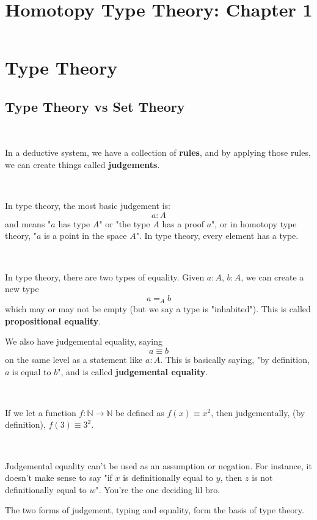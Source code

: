 \documentclass{article}
\title{Homotopy Type Theory: Chapter 1}
\begin{document}
\maketitle

\section{Type Theory}

\subsection{Type Theory vs Set Theory}

\begin{definition}
\

In a deductive system, we have a collection of \textbf{rules}, and by applying those rules, we can create things called \textbf{judgements}.  
\end{definition}

\begin{definition}[Type]
\

In type theory, the most basic judgement is: $$a:A$$and means "$a$ has type $A$" or "the type $A$ has a proof $a$", or in homotopy type theory, "$a$ is a point in the space $A$". In type theory, every element has a type.
\end{definition}

\begin{definition}[Equality]
\

In type theory, there are two types of equality. Given $a: A$, $b:A$, we can create a new type $$a =_A b$$which may or may not be empty (but we say a type is "inhabited"). This is called \textbf{propositional equality}.

We also have judgemental equality, saying $$a \equiv b$$on the same level as a statement like $a:A$. This is basically saying, "by definition, $a$ is equal to $b$", and is called \textbf{judgemental equality}. 
\end{definition}

\begin{example}
\

If we let a function $f: \mathbb{N} \to \mathbb{N}$ be defined as $f(x) \equiv x^2$, then judgementally, (by definition), $f(3) \equiv 3^2$. 
\end{example}

\begin{remark}
\

Judgemental equality can't be used as an assumption or negation. For instance, it doesn't make sense to say "if $x$ is definitionally equal to $y$, then $z$ is not definitionally equal to $w$". You're the one deciding lil bro.

The two forms of judgement, typing and equality, form the basis of type theory.
\end{remark}
\end{document}
